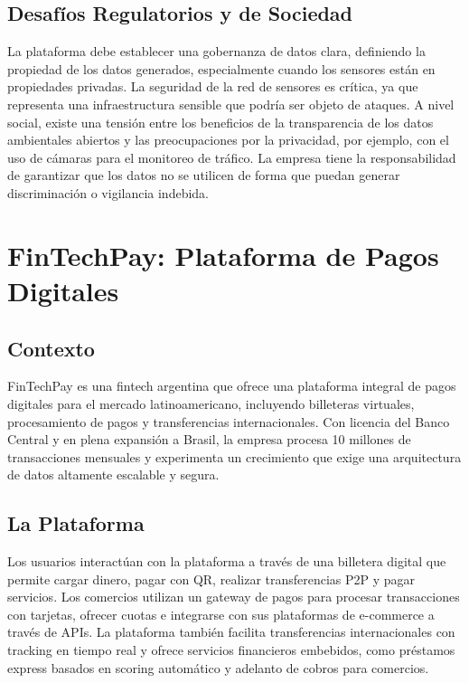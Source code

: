 \documentclass[12pt]{article}
\begin{document}
\subsection{Desafíos Regulatorios y de Sociedad}
La plataforma debe establecer una gobernanza de datos clara, definiendo la propiedad de los datos generados, especialmente cuando los sensores están en propiedades privadas. La seguridad de la red de sensores es crítica, ya que representa una infraestructura sensible que podría ser objeto de ataques. A nivel social, existe una tensión entre los beneficios de la transparencia de los datos ambientales abiertos y las preocupaciones por la privacidad, por ejemplo, con el uso de cámaras para el monitoreo de tráfico. La empresa tiene la responsabilidad de garantizar que los datos no se utilicen de forma que puedan generar discriminación o vigilancia indebida.

\newpage

\section{FinTechPay: Plataforma de Pagos Digitales}

\subsection{Contexto}
FinTechPay es una fintech argentina que ofrece una plataforma integral de pagos digitales para el mercado latinoamericano, incluyendo billeteras virtuales, procesamiento de pagos y transferencias internacionales. Con licencia del Banco Central y en plena expansión a Brasil, la empresa procesa 10 millones de transacciones mensuales y experimenta un crecimiento que exige una arquitectura de datos altamente escalable y segura.

\subsection{La Plataforma}
Los usuarios interactúan con la plataforma a través de una billetera digital que permite cargar dinero, pagar con QR, realizar transferencias P2P y pagar servicios. Los comercios utilizan un gateway de pagos para procesar transacciones con tarjetas, ofrecer cuotas e integrarse con sus plataformas de e-commerce a través de APIs. La plataforma también facilita transferencias internacionales con tracking en tiempo real y ofrece servicios financieros embebidos, como préstamos express basados en scoring automático y adelanto de cobros para comercios.
\end{document}

